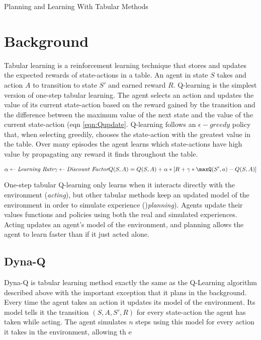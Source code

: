 Planning and Learning With Tabular Methods

\section{Background}

Tabular learning is a reinforcement learning technique that stores and updates the expected rewards of state-actions in a table. An agent in state $S$ takes and action $A$ to transition to state $S'$ and earned reward $R$. Q-learning is the simplest version of one-step tabular learning. The agent selects an action and updates the value of its current state-action based on the reward gained by the transition and the difference between the maximum value of the next state and the value of the current state-action (eqn \ref{eqn:Qupdate}. Q-learning follows an $\epsilon-greedy$ policy that, when selecting greedily, chooses the state-action with the greatest value in the table. Over many episodes the agent learns which state-actions have high value by propagating any reward it finds throughout the table.

\begin{equation}\label{eqn:Qupdate}
    \alpha \leftarrow \textit{Learning Rate}
    \gamma \leftarrow \textit{Discount Factor}
    Q(S,A) = Q(S,A) + \alpha * [R + \gamma * \maxQ(S',a) - Q(S,A)]
\end{equation}


One-step tabular Q-learning only learns when it interacts directly with the environment (\textit{acting}), but other tabular methods keep an updated model of the environment in order to simulate experience ()\textit{planning}). Agents update their values functions and policies using both the real and simulated experiences. Acting updates an agent's model of the environment, and planning allows the agent to learn faster than if it just acted alone. 


\subsection{Dyna-Q}

Dyna-Q \cite{sutton_introduction_1998} is tabular learning method exactly the same as the Q-Learning algorithm described above with the important exception that it plans in the background. Every time the agent takes an action it updates its model of the environment. Its model tells it the transition $(S,A,S',R)$ for every state-action the agent has taken while acting. The agent simulates $n$ steps using this model for every action it takes in the environment, allowing th e


